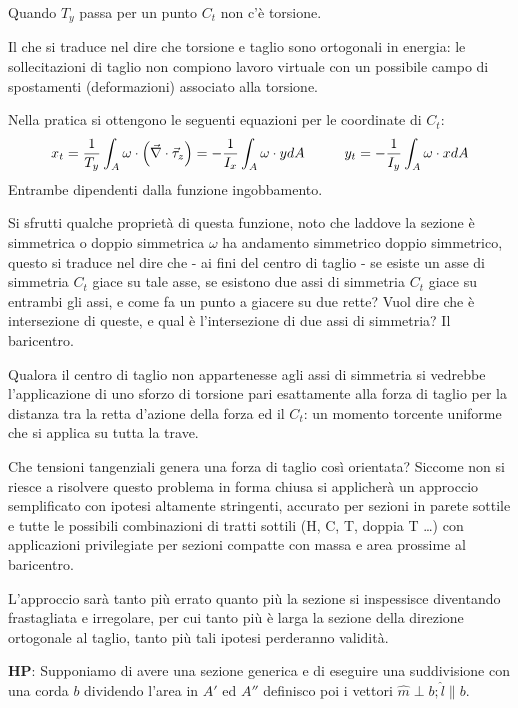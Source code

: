 		 Quando $T_y$ passa per un punto $C_t$ non c'è torsione.
		 
		 Il che si traduce nel dire che  torsione e taglio sono ortogonali in energia: le sollecitazioni di taglio non compiono lavoro virtuale con un possibile campo di spostamenti (deformazioni) associato alla torsione. \newline
		 
		 Nella pratica si ottengono le seguenti equazioni per le coordinate di $C_t$:
		 \[  x_t = {1\over T_y} \int_A\omega \cdot \left(\vec{\nabla}\cdot\vec{\tau}_z\right) = -{1\over I_x}\int_A\omega\cdot ydA \hspace{1cm} y_t = -{1\over I_y}\int_A\omega\cdot xdA\]
		 Entrambe dipendenti dalla funzione ingobbamento. 
		 
		 Si sfrutti qualche proprietà di questa funzione, noto che laddove la sezione è simmetrica o doppio simmetrica $\omega$ ha andamento simmetrico doppio simmetrico, questo si traduce nel dire che - ai fini del centro di taglio - se esiste un asse  di simmetria $C_t$ giace su tale asse, se esistono due assi di simmetria $C_t$ giace su entrambi gli assi, e come fa un punto a giacere su due rette? Vuol dire che è intersezione di queste, e qual è l'intersezione di due assi di simmetria? Il baricentro. 
		 
		 Qualora il centro di taglio non appartenesse agli assi di simmetria si vedrebbe l'applicazione di uno sforzo di torsione pari esattamente alla forza di taglio per la distanza tra la retta d'azione della forza ed il $C_t$: un momento torcente uniforme che si applica su tutta la trave. \newline 
		 
		 Che tensioni tangenziali genera una forza di taglio così orientata? Siccome non si riesce a risolvere questo problema in forma chiusa si applicherà un approccio semplificato con ipotesi altamente stringenti, accurato per sezioni in parete sottile e tutte le possibili combinazioni di tratti sottili (H, C, T, doppia T \dots) con applicazioni privilegiate per sezioni compatte con massa e area prossime al baricentro. 
		 
		 L'approccio sarà tanto più errato quanto più la sezione si inspessisce diventando frastagliata e irregolare, per cui tanto più è larga la sezione della direzione ortogonale al taglio, tanto più tali ipotesi perderanno validità.\newpage
		 
		 \textbf{HP}: Supponiamo di avere una sezione generica e di eseguire una suddivisione con una corda $b$ dividendo l'area in $A'$ ed $A''$ definisco poi i vettori $\hat{m} \perp b; \hat{l} \parallel b$. 
		 
